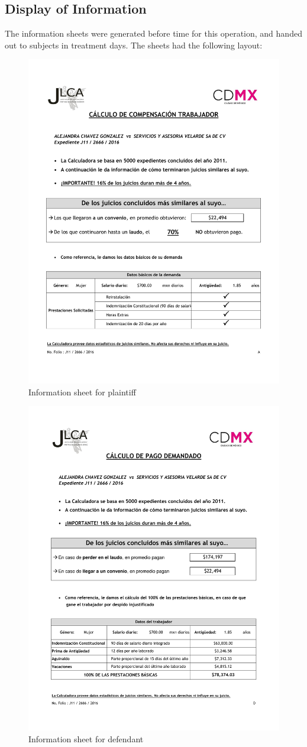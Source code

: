 \documentclass[]{article}
\begin{document}
\subsection{Display of Information}\label{display-of-information-1}

The information sheets were generated before time for this operation,
and handed out to subjects in treatment days. The sheets had the
following layout:

\begin{figure}[H]
\centering
\caption{Information sheet for plaintiff}
\includegraphics[width=.75\textwidth]{calctreat_act.pdf}

\end{figure}


\begin{figure}[H]
\centering
\caption{Information sheet for defendant}
\includegraphics[width=.75\textwidth]{calctreat_dem.pdf}

\end{figure}
\end{document}
